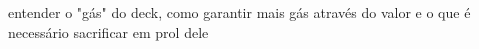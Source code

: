 entender o "gás" do deck, como garantir mais gás através do valor e o que é necessário sacrificar em prol dele